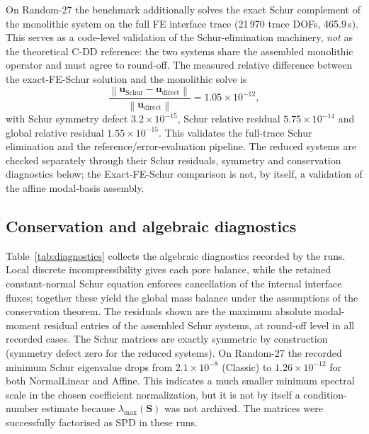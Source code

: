 \documentclass[11pt,a4paper]{article}
\newcommand{\vel}{\bm{u}}
\newcommand{\Schur}{\mathbf{S}}
\newcommand{\norm}[1]{\left\|#1\right\|}
\begin{document}
On Random-27 the benchmark additionally solves the exact Schur
complement of the monolithic system on the full FE interface trace
(21\,970 trace DOFs, 465.9\,s).  This serves as a code-level validation
of the Schur-elimination machinery, \emph{not} as the theoretical C-DD
reference: the two systems share the assembled monolithic operator and
must agree to round-off.  The measured relative difference between the
exact-FE-Schur solution and the monolithic solve is
\begin{equation}
  \frac{\norm{\vel_{\mathrm{Schur}}-\vel_{\mathrm{direct}}}}
       {\norm{\vel_{\mathrm{direct}}}} = 1.05\times10^{-12},
\end{equation}
with Schur symmetry defect $3.2\times10^{-15}$, Schur relative residual
$5.75\times10^{-14}$ and global relative residual $1.55\times10^{-15}$.
This validates the full-trace Schur elimination and the
reference/error-evaluation pipeline.  The reduced systems are checked
separately through their Schur residuals, symmetry and conservation
diagnostics below; the Exact-FE-Schur comparison is not, by itself, a
validation of the affine modal-basis assembly.

\subsection{Conservation and algebraic diagnostics}
\label{sec:algebraic}

Table~\ref{tab:diagnostics} collects the algebraic diagnostics recorded
by the runs.  Local discrete incompressibility gives each pore balance,
while the retained constant-normal Schur equation enforces cancellation
of the internal interface fluxes; together these yield the global mass
balance under the assumptions of the conservation theorem.  The
residuals shown are the maximum absolute modal-moment residual entries of
the assembled Schur systems, at round-off level in all recorded cases.  The Schur matrices are
exactly symmetric by construction (symmetry defect zero for the reduced
systems).  On Random-27 the recorded minimum Schur eigenvalue drops from
$2.1\times10^{-8}$ (Classic) to $1.26\times10^{-12}$ for both
NormalLinear and Affine.  This indicates a much smaller minimum spectral
scale in the chosen coefficient normalization, but it is not by itself a
condition-number estimate because $\lambda_{\max}(\Schur)$ was not
archived.  The matrices were successfully factorised as SPD in these
runs.
\end{document}
